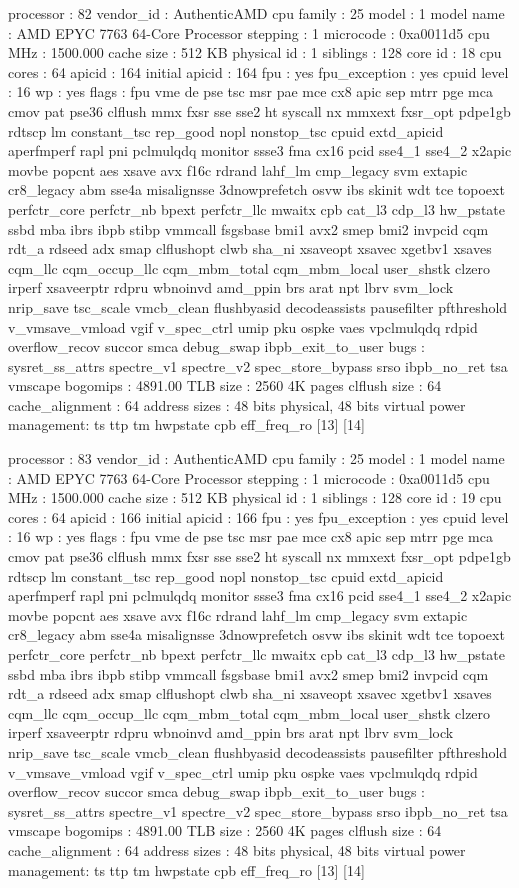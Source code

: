 processor	: 82
vendor_id	: AuthenticAMD
cpu family	: 25
model		: 1
model name	: AMD EPYC 7763 64-Core Processor
stepping	: 1
microcode	: 0xa0011d5
cpu MHz		: 1500.000
cache size	: 512 KB
physical id	: 1
siblings	: 128
core id		: 18
cpu cores	: 64
apicid		: 164
initial apicid	: 164
fpu		: yes
fpu_exception	: yes
cpuid level	: 16
wp		: yes
flags		: fpu vme de pse tsc msr pae mce cx8 apic sep mtrr pge mca cmov pat pse36 clflush mmx fxsr sse sse2 ht syscall nx mmxext fxsr_opt pdpe1gb rdtscp lm constant_tsc rep_good nopl nonstop_tsc cpuid extd_apicid aperfmperf rapl pni pclmulqdq monitor ssse3 fma cx16 pcid sse4_1 sse4_2 x2apic movbe popcnt aes xsave avx f16c rdrand lahf_lm cmp_legacy svm extapic cr8_legacy abm sse4a misalignsse 3dnowprefetch osvw ibs skinit wdt tce topoext perfctr_core perfctr_nb bpext perfctr_llc mwaitx cpb cat_l3 cdp_l3 hw_pstate ssbd mba ibrs ibpb stibp vmmcall fsgsbase bmi1 avx2 smep bmi2 invpcid cqm rdt_a rdseed adx smap clflushopt clwb sha_ni xsaveopt xsavec xgetbv1 xsaves cqm_llc cqm_occup_llc cqm_mbm_total cqm_mbm_local user_shstk clzero irperf xsaveerptr rdpru wbnoinvd amd_ppin brs arat npt lbrv svm_lock nrip_save tsc_scale vmcb_clean flushbyasid decodeassists pausefilter pfthreshold v_vmsave_vmload vgif v_spec_ctrl umip pku ospke vaes vpclmulqdq rdpid overflow_recov succor smca debug_swap ibpb_exit_to_user
bugs		: sysret_ss_attrs spectre_v1 spectre_v2 spec_store_bypass srso ibpb_no_ret tsa vmscape
bogomips	: 4891.00
TLB size	: 2560 4K pages
clflush size	: 64
cache_alignment	: 64
address sizes	: 48 bits physical, 48 bits virtual
power management: ts ttp tm hwpstate cpb eff_freq_ro [13] [14]

processor	: 83
vendor_id	: AuthenticAMD
cpu family	: 25
model		: 1
model name	: AMD EPYC 7763 64-Core Processor
stepping	: 1
microcode	: 0xa0011d5
cpu MHz		: 1500.000
cache size	: 512 KB
physical id	: 1
siblings	: 128
core id		: 19
cpu cores	: 64
apicid		: 166
initial apicid	: 166
fpu		: yes
fpu_exception	: yes
cpuid level	: 16
wp		: yes
flags		: fpu vme de pse tsc msr pae mce cx8 apic sep mtrr pge mca cmov pat pse36 clflush mmx fxsr sse sse2 ht syscall nx mmxext fxsr_opt pdpe1gb rdtscp lm constant_tsc rep_good nopl nonstop_tsc cpuid extd_apicid aperfmperf rapl pni pclmulqdq monitor ssse3 fma cx16 pcid sse4_1 sse4_2 x2apic movbe popcnt aes xsave avx f16c rdrand lahf_lm cmp_legacy svm extapic cr8_legacy abm sse4a misalignsse 3dnowprefetch osvw ibs skinit wdt tce topoext perfctr_core perfctr_nb bpext perfctr_llc mwaitx cpb cat_l3 cdp_l3 hw_pstate ssbd mba ibrs ibpb stibp vmmcall fsgsbase bmi1 avx2 smep bmi2 invpcid cqm rdt_a rdseed adx smap clflushopt clwb sha_ni xsaveopt xsavec xgetbv1 xsaves cqm_llc cqm_occup_llc cqm_mbm_total cqm_mbm_local user_shstk clzero irperf xsaveerptr rdpru wbnoinvd amd_ppin brs arat npt lbrv svm_lock nrip_save tsc_scale vmcb_clean flushbyasid decodeassists pausefilter pfthreshold v_vmsave_vmload vgif v_spec_ctrl umip pku ospke vaes vpclmulqdq rdpid overflow_recov succor smca debug_swap ibpb_exit_to_user
bugs		: sysret_ss_attrs spectre_v1 spectre_v2 spec_store_bypass srso ibpb_no_ret tsa vmscape
bogomips	: 4891.00
TLB size	: 2560 4K pages
clflush size	: 64
cache_alignment	: 64
address sizes	: 48 bits physical, 48 bits virtual
power management: ts ttp tm hwpstate cpb eff_freq_ro [13] [14]

